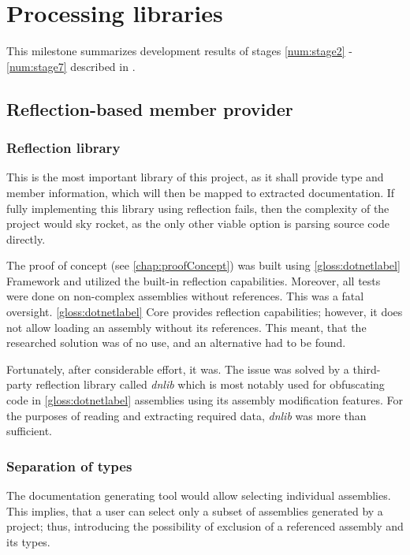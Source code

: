 \chapter{Processing libraries}

This milestone summarizes development results of stages \ref{num:stage2} - \ref{num:stage7} described in .

\section{Reflection-based member provider}

\subsection{Reflection library}

This is the most important library of this project, as it shall provide type and member information, which will then be mapped to extracted documentation. If fully implementing this library using reflection fails, then the complexity of the project would sky rocket, as the only other viable option is parsing source code directly.

The proof of concept (see \ref{chap:proofConcept}) was built using \ref{gloss:dotnetlabel} Framework and utilized the built-in reflection capabilities. Moreover, all tests were done on non-complex assemblies without references. This was a fatal oversight. \ref{gloss:dotnetlabel} Core provides reflection capabilities; however, it does not allow loading an assembly without its references. This meant, that the researched solution was of no use, and an alternative had to be found.

Fortunately, after considerable effort, it was. The issue was solved by a third-party reflection library called \textit{dnlib} which is most notably used for obfuscating code in \ref{gloss:dotnetlabel} assemblies using its assembly modification features. For the purposes of reading and extracting required data, \textit{dnlib} was more than sufficient.

\subsection{Separation of types}

The documentation generating tool would allow selecting individual assemblies. This implies, that a user can select only a subset of assemblies generated by a project; thus, introducing the possibility of exclusion of a referenced assembly and its types.

